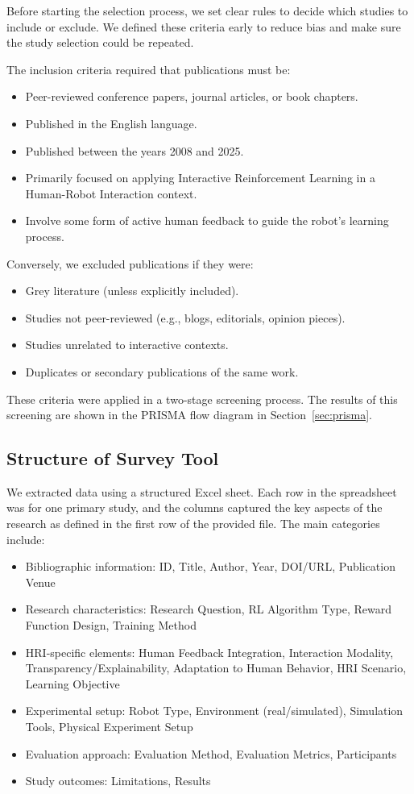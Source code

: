 \documentclass[rnd]{mas_proposal}
\begin{document}
Before starting the selection process, we set clear rules to decide which studies to include or exclude. We defined these criteria early to reduce bias and make sure the study selection could be repeated.

The inclusion criteria required that publications must be:
\begin{itemize}
    \item Peer-reviewed conference papers, journal articles, or book chapters.
    \item Published in the English language.
    \item Published between the years 2008 and 2025.
    \item Primarily focused on applying Interactive Reinforcement Learning in a Human-Robot Interaction context.
    \item Involve some form of active human feedback to guide the robot's learning process.
\end{itemize}
Conversely, we excluded publications if they were:
\begin{itemize}
    \item Grey literature (unless explicitly included).
    \item Studies not peer-reviewed (e.g., blogs, editorials, opinion pieces).
    \item Studies unrelated to interactive contexts.
    \item Duplicates or secondary publications of the same work.

\end{itemize}

These criteria were applied in a two-stage screening process. The results of this screening are shown in the PRISMA flow diagram in Section~\ref{sec:prisma}.

\subsection{Structure of Survey Tool}
We extracted data using a structured Excel sheet. Each row in the spreadsheet was for one primary study, and the columns captured the key aspects of the research as defined in the first row of the provided file. The main categories include:
\begin{itemize}
    \item Bibliographic information: ID, Title, Author, Year, DOI/URL, Publication Venue
    \item Research characteristics: Research Question, RL Algorithm Type, Reward Function Design, Training Method
    \item HRI-specific elements: Human Feedback Integration, Interaction Modality, Transparency/Explainability, Adaptation to Human Behavior, HRI Scenario, Learning Objective
    \item Experimental setup: Robot Type, Environment (real/simulated), Simulation Tools, Physical Experiment Setup
    \item Evaluation approach: Evaluation Method, Evaluation Metrics, Participants
    \item Study outcomes: Limitations, Results
\end{itemize}
\end{document}
